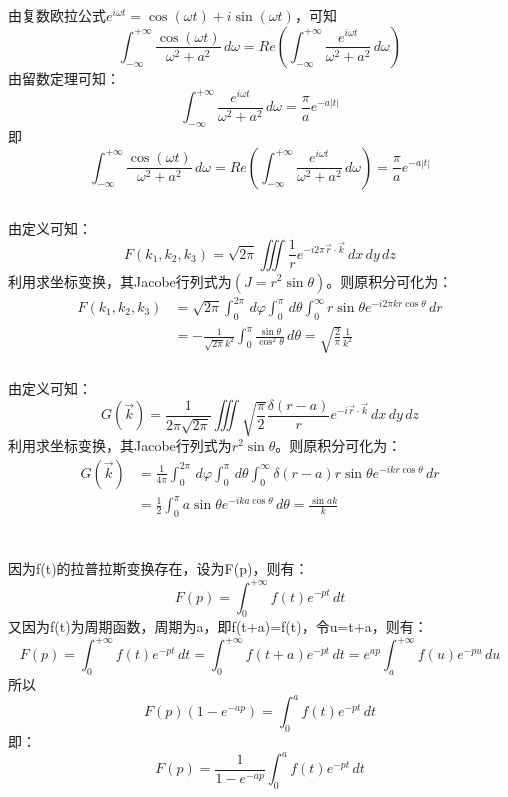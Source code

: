\documentclass[10.5pt]{article}
\begin{document}
\subsection{}
由复数欧拉公式$e^{i\omega t} = \cos(\omega t) + i\sin(\omega t)$，可知$$\int_{-\infty}^{+\infty} \frac{\cos(\omega t)}{\omega^2 + a^2} \,d\omega = Re\left(\int_{-\infty}^{+\infty} \frac{e^{i\omega t}}{\omega^2 + a^2} \,d\omega \right) $$\indent
由留数定理可知：$$\int_{-\infty}^{+\infty} \frac{e^{i\omega t}}{\omega^2 + a^2} \,d\omega = \frac{\pi}{a} e^{-a\left\lvert t\right\rvert }$$\indent
即$$\int_{-\infty}^{+\infty} \frac{\cos(\omega t)}{\omega^2 + a^2} \,d\omega = Re\left(\int_{-\infty}^{+\infty} \frac{e^{i\omega t}}{\omega^2 + a^2} \,d\omega \right) = \frac{\pi}{a} e^{-a\left\lvert t\right\rvert }$$
\subsection{}
\subsubsection{}
由定义可知：$$F(k_1,k_2,k_3)=\sqrt{2\pi}\iiint \frac{1}{r}e^{-i2\pi\vec{r}\cdot\vec{k}} \,dx\,dy\,dz$$\indent
利用求坐标变换，其Jacobe行列式为$(J=r^2\sin\theta)$。则原积分可化为：$$\begin{aligned}
    F(k_1,k_2,k_3) &= \sqrt{2\pi}\int_0^{2\pi} \,d\varphi \int_0^{\pi} \,d\theta \int_0^{\infty} r\sin\theta e^{-i2\pi kr\cos\theta} \,dr\\
    &=-\frac{1}{\sqrt{2\pi} k^2}\int_0^{\pi} \frac{\sin\theta}{\cos^2\theta}\,d\theta = \sqrt{\frac{2}{\pi}}\frac{1}{k^2}
\end{aligned}$$\indent
\subsubsection{}
由定义可知：$$G(\vec{k})=\frac{1}{2\pi\sqrt{2\pi}}\iiint \sqrt{\frac{\pi}{2}}\frac{\delta(r-a)}{r}e^{-i \vec{r}\cdot\vec{k}}\,dx\,dy\,dz$$\indent
利用求坐标变换，其Jacobe行列式为$r^2\sin\theta$。则原积分可化为：$$\begin{aligned}
    G(\vec{k})&=\frac{1}{4\pi} \int_0^{2\pi} \,d\varphi \int_0^{\pi} \,d\theta \int_0^{\infty} \delta(r-a)r\sin\theta e^{-i kr\cos\theta}\,dr\\
    &=\frac{1}{2}\int_0^{\pi}a\sin\theta e^{-ika\cos\theta} \,d\theta = \frac{\sin ak}{k}
\end{aligned}$$

\section{}
因为f(t)的拉普拉斯变换存在，设为F(p)，则有：$$F(p)=\int_0^{+\infty} f(t)e^{-pt}\,dt$$\indent
又因为f(t)为周期函数，周期为a，即f(t+a)=f(t)，令u=t+a，则有：$$F(p)=\int_0^{+\infty} f(t)e^{-pt}\,dt = \int_0^{+\infty} f(t+a)e^{-pt}\,dt = e^{ap}\int_a^{+\infty}f(u)e^{-pu}\,du$$\indent
所以$$F(p)\left(1-e^{-ap}\right) = \int_0^a f(t)e^{-pt}\,dt$$\indent
即：$$F(p) = \frac{1}{1-e^{-ap}} \int_0^a f(t)e^{-pt}\,dt$$
\end{document}

